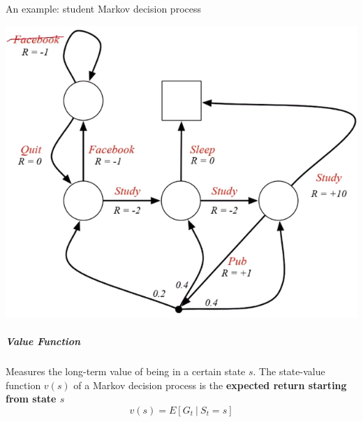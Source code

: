 \documentclass[10pt]{report}
\begin{document}
An example: student Markov decision process
\begin{center}
	\includegraphics[scale=0.5]{160.png}
\end{center}
\subparagraph{Value Function} Measures the long-term value of being in a certain state $s$. The state-value function $v(s)$ of a Markov decision process is the \textbf{expected return starting from state $s$}
$$v(s)=E[G_t\:|\:S_t=s]$$
\end{document}
